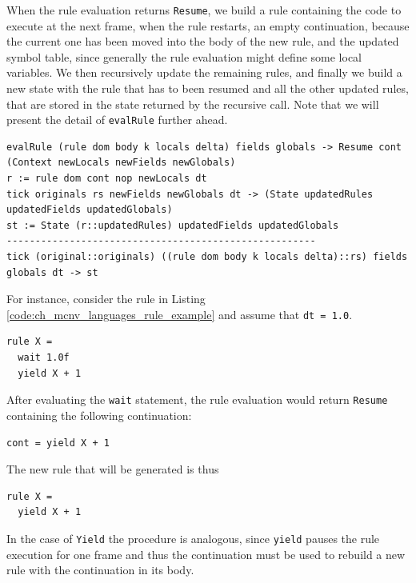 When the rule evaluation returns \texttt{Resume}, we build a rule containing the code to execute at the next frame, when the rule restarts, an empty continuation, because the current one has been moved into the body of the new rule, and the updated symbol table, since generally the rule evaluation might define some local variables. We then recursively update the remaining rules, and finally we build a new state with the rule that has to been resumed and all the other updated rules, that are stored in the state returned by the recursive call. Note that we will present the detail of \texttt{evalRule} further ahead.

\begin{lstlisting}
evalRule (rule dom body k locals delta) fields globals -> Resume cont (Context newLocals newFields newGlobals)
r := rule dom cont nop newLocals dt
tick originals rs newFields newGlobals dt -> (State updatedRules updatedFields updatedGlobals)
st := State (r::updatedRules) updatedFields updatedGlobals
------------------------------------------------------
tick (original::originals) ((rule dom body k locals delta)::rs) fields globals dt -> st
\end{lstlisting}

\noindent
For instance, consider the rule in Listing \ref{code:ch_mcnv_languages_rule_example} and assume that \texttt{dt = 1.0}.

\begin{lstlisting}[caption = Rule example with interruption, label = code:ch_mcnv_languages_rule_example]
rule X =
  wait 1.0f
  yield X + 1
\end{lstlisting}

\noindent
After evaluating the \texttt{wait} statement, the rule evaluation would return \texttt{Resume} containing the following continuation:

\begin{lstlisting}
cont = yield X + 1
\end{lstlisting}

\noindent
The new rule that will be generated is thus

\begin{lstlisting}
rule X =
  yield X + 1
\end{lstlisting}

\noindent
In the case of \texttt{Yield} the procedure is analogous, since \texttt{yield} pauses the rule execution for one frame and thus the continuation must be used to rebuild a new rule with the continuation in its body.

